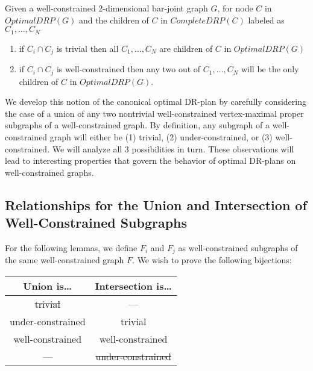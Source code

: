 \documentclass[11pt]{article}
\begin{document}
\begin{theorem}\label{t1}
Given a well-constrained 2-dimensional bar-joint graph $G$, for node $C$ in $OptimalDRP(G)$ and the children of $C$ in $CompleteDRP(C)$ labeled as $C_1,\ldots,C_N$
\begin{enumerate}
    \item if $C_i \cap C_j$ is trivial then all $C_1,\ldots,C_N$ are children of $C$ in $OptimalDRP(G)$
    \item if $C_i \cap C_j$ is well-constrained then any two out of $C_1,\ldots,C_N$ will be the only children of $C$ in $OptimalDRP(G)$.
\end{enumerate}
\end{theorem}

We develop this notion of the canonical optimal DR-plan by carefully considering the case of a union of any two nontrivial well-constrained vertex-maximal proper subgraphs of a well-constrained graph. By definition, any subgraph of a well-constrained graph will either be (1) trivial, (2) under-constrained, or (3) well-constrained. We will analyze all 3 possibilities in turn. These observations will lead to interesting properties that govern the behavior of optimal DR-plans on well-constrained graphs.






\subsection{Relationships for the Union and Intersection of Well-Constrained Subgraphs}
For the following lemmas, we define $F_i$ and $F_j$ as well-constrained subgraphs of the same well-constrained graph $F$.
We wish to prove the following bijections:

\begin{center}
\begin{tabular}{|c|c|}
\hline
\textbf{Union is\ldots} & \textbf{Intersection is\ldots} \\ \hline
\sout{trivial}          & --- \\ \hline
under-constrained       & trivial \\ \hline
well-constrained        & well-constrained \\ \hline
---                     & \sout{under-constrained} \\ \hline
\end{tabular}
\end{center}
\end{document}
